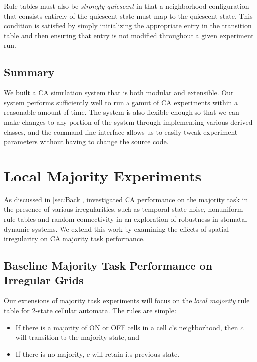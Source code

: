 \documentclass[a4paper,11pt]{article}
\begin{document}
Rule tables must also be \textit{strongly quiescent} in that a neighborhood configuration that consists entirely of the quiescent state must map to the quiescent state. This condition is satisfied by simply initializing the appropriate entry in the transition table and then ensuring that entry is not modified throughout a given experiment run.

\subsection{Summary}
We built a CA simulation system that is both modular and extensible. Our system performs sufficiently well to run a gamut of CA experiments within a reasonable amount of time. The system is also flexible enough so that we can make changes to any portion of the system through implementing various derived classes, and the command line interface allows us to easily tweak experiment parameters without having to change the source code.


\section{Local Majority Experiments}
\label{sec:local_maj}

As discussed in \ref{sec:Back}, \citeauthor{me07} investigated CA performance on the majority task in the presence of various irregularities, such as temporal state noise, nonuniform rule tables and random connectivity in an exploration of robustness in stomatal dynamic systems. We extend this work by examining the effects of spatial irregularity on CA majority task performance.

\subsection{Baseline Majority Task Performance on Irregular Grids}

Our extensions of majority task experiments will focus on the \textit{local majority} rule table for 2-state cellular automata. The rules are simple:

\begin{itemize}
\item If there is a majority of ON or OFF cells in a cell $c$'s neighborhood, then $c$ will transition to the majority state, and
\item If there is no majority, $c$ will retain its previous state.
\end{itemize}
\end{document}
